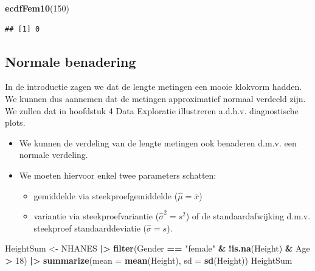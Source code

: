 \documentclass[
  12pt,dutch]{book}
\newenvironment{Shaded}{\begin{snugshade}}{\end{snugshade}}
\newcommand{\AttributeTok}[1]{\textcolor[rgb]{0.13,0.29,0.53}{#1}}
\newcommand{\DecValTok}[1]{\textcolor[rgb]{0.00,0.00,0.81}{#1}}
\newcommand{\FunctionTok}[1]{\textcolor[rgb]{0.13,0.29,0.53}{\textbf{#1}}}
\newcommand{\NormalTok}[1]{#1}
\newcommand{\OtherTok}[1]{\textcolor[rgb]{0.56,0.35,0.01}{#1}}
\newcommand{\SpecialCharTok}[1]{\textcolor[rgb]{0.81,0.36,0.00}{\textbf{#1}}}
\newcommand{\StringTok}[1]{\textcolor[rgb]{0.31,0.60,0.02}{#1}}
\providecommand{\tightlist}{%
  \setlength{\itemsep}{0pt}\setlength{\parskip}{0pt}}
\theoremstyle{definition}
\theoremstyle{definition}
\theoremstyle{definition}
\theoremstyle{definition}
\theoremstyle{remark}
\begin{document}
\begin{Shaded}
\begin{Highlighting}[]
\FunctionTok{ecdfFem10}\NormalTok{(}\DecValTok{150}\NormalTok{)}
\end{Highlighting}
\end{Shaded}

\begin{verbatim}
## [1] 0
\end{verbatim}

\subsection{Normale benadering}\label{normale-benadering}

In de introductie zagen we dat de lengte metingen een mooie klokvorm hadden. We kunnen dus aannemen dat de metingen approximatief normaal verdeeld zijn. We zullen dat in hoofdstuk 4 Data Exploratie illustreren a.d.h.v. diagnostische plots.

\begin{itemize}
\item
  We kunnen de verdeling van de lengte metingen ook benaderen d.m.v. een normale verdeling.
\item
  We moeten hiervoor enkel twee parameters schatten:

  \begin{itemize}
  \tightlist
  \item
    gemiddelde via steekproefgemiddelde (\(\hat\mu=\bar x\))
  \item
    variantie via steekproefvariantie (\(\hat{\sigma}^2= s^2\)) of de standaardafwijking d.m.v. steekproef standaarddeviatie (\(\hat\sigma=s\)).
  \end{itemize}
\end{itemize}

\begin{Shaded}
\begin{Highlighting}[]
\NormalTok{HeightSum }\OtherTok{\textless{}{-}}\NormalTok{ NHANES }\SpecialCharTok{|\textgreater{}}
    \FunctionTok{filter}\NormalTok{(Gender }\SpecialCharTok{==} \StringTok{"female"} \SpecialCharTok{\&} \SpecialCharTok{!}\FunctionTok{is.na}\NormalTok{(Height) }\SpecialCharTok{\&}\NormalTok{ Age }\SpecialCharTok{\textgreater{}}
        \DecValTok{18}\NormalTok{) }\SpecialCharTok{|\textgreater{}}
    \FunctionTok{summarize}\NormalTok{(}\AttributeTok{mean =} \FunctionTok{mean}\NormalTok{(Height), }\AttributeTok{sd =} \FunctionTok{sd}\NormalTok{(Height))}
\NormalTok{HeightSum}
\end{Highlighting}
\end{Shaded}
\end{document}
